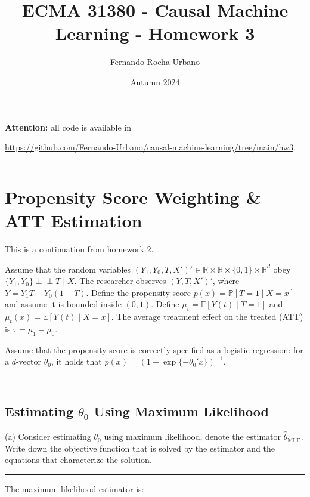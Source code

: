 \documentclass{article}
\title{ECMA 31380 - Causal Machine Learning - Homework 3}
\author{Fernando Rocha Urbano}
\date{Autumn 2024}
\newenvironment{colorparagraph}[1]{\par\color{#1}}{\par}
\begin{document}
\maketitle

\textbf{Attention:} all code is available in

\url{https://github.com/Fernando-Urbano/causal-machine-learning/tree/main/hw3}.

\begin{colorparagraph}{questioncolor}
\rule{\textwidth}{0.5pt}
\label{q1}
\section{Propensity Score Weighting \& ATT Estimation}

This is a continuation from homework 2.

Assume that the random variables \((Y_1, Y_0, T, X')' \in \mathbb{R} \times \mathbb{R} \times \{0, 1\} \times \mathbb{R}^d\) obey \(\{Y_1, Y_0\} \perp\!\!\!\perp T \mid X\).
The researcher observes \((Y, T, X')'\), where \( Y = Y_1 T + Y_0 (1 - T) \).
Define the propensity score \( p(x) = \mathbb{P}[T = 1 \mid X = x] \) and assume it is bounded inside \( (0, 1) \).
Define \( \mu_t = \mathbb{E}[Y(t) \mid T = 1] \) and \( \mu_t(x) = \mathbb{E}[Y(t) \mid X = x] \).
The average treatment effect on the treated (ATT) is \( \tau = \mu_1 - \mu_0 \).

Assume that the propensity score is correctly specified as a logistic regression: for a \( d \)-vector \( \theta_0 \), it holds that \( p(x) = (1 + \exp\{-\theta_0' x\})^{-1} \).

\rule{\textwidth}{0.5pt}
\end{colorparagraph}

\begin{colorparagraph}{questioncolor}
\label{q1a}
\rule{\textwidth}{0.5pt}
\subsection{Estimating \( \theta_0 \) Using Maximum Likelihood}
(a) Consider estimating \( \theta_0 \) using maximum likelihood, denote the estimator \( \hat{\theta}_{\text{MLE}} \).
Write down the objective function that is solved by the estimator and the equations that characterize the solution.

\rule{\textwidth}{0.5pt}
\end{colorparagraph}

The maximum likelihood estimator is:
\end{document}

